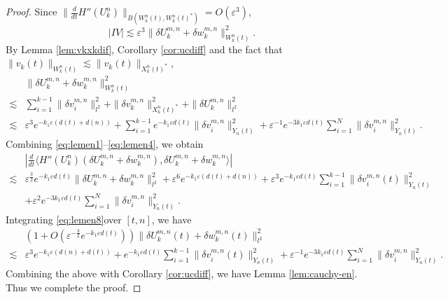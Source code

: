 \documentclass[11pt]{amsart}
\theoremstyle{remark}
\numberwithin{equation}{section}
\begin{document}
\begin{proof}
Since $\|\frac{d}{dt}H''(U_k^n)\|_{B(W_k^n(t),W_k^n(t)^*)}=O({\varepsilon}^3)$,
\begin{equation}
  \label{eq:lemen7}
  |IV|\lesssim  {\varepsilon}^3\|{\delta U}_k^{m,n}+{\delta w}^{m,n}_k\|_{W_k^n(t)}^2.
\end{equation}
By Lemma \ref{lem:vkxkdif}, Corollary \ref{cor:ucdiff}
and the fact that $\|v_k(t)\|_{W_k^n(t)}\lesssim \|v_k(t)\|_{X_k^n(t)^*}$,
\begin{equation}
  \label{eq:lemen4}
  \begin{split}
& \|{\delta U}_k^{m,n}+{\delta w}^{m,n}_k\|_{W_k^n(t)}^2 \\ \lesssim & \sum_{i=1}^{k-1}\|{\delta v}_i^{m,n}\|_{l^2}^2
+\|{\delta v}_k^{m,n}\|_{X_k^n(t)^*}^2 +\|{\delta U}_k^{m,n}\|_{l^2}^2
\\ \lesssim & {\varepsilon}^3e^{-k_1{\varepsilon}(d(t)+d(n))}
+\sum_{i=1}^{k-1}e^{-k_1{\varepsilon} d(t)}\|{\delta v}_i^{m,n}\|_{Y_n(t)}^2
+ {\varepsilon}^{-1}e^{-3k_1{\varepsilon} d(t)}\sum_{i=1}^N \|{\delta v}_i^{m,n}\|_{Y_n(t)}^2.
  \end{split}
\end{equation}
Combining \eqref{eq:lemen1}--\eqref{eq:lemen4}, we obtain
\begin{equation}
  \label{eq:lemen8}
  \begin{split}
    & \left|\frac{d}{dt}{\langle} H''(U_k^n)({\delta U}_k^{m,n}+{\delta w}^{m,n}_k), {\delta U}_k^{m,n}+{\delta w}^{m,n}_k{\rangle}\right|
\\ \lesssim & {\varepsilon}^{\frac32}e^{-k_1{\varepsilon} d(t)}\|{\delta U}_k^{m,n}+{\delta w}^{m,n}_k\|_{l^2}^2
+{\varepsilon}^6e^{-k_1{\varepsilon}(d(t)+d(n))}+{\varepsilon}^3e^{-k_1{\varepsilon} d(t)}\sum_{i=1}^{k-1}\|{\delta v}_i^{m,n}(t)\|_{Y_n(t)}^2
\\ & +{\varepsilon}^2e^{-3k_1{\varepsilon} d(t)}\sum_{i=1}^N\|{\delta v}_i^{m,n}\|_{Y_n(t)}^2.
  \end{split}
\end{equation}
Integrating \eqref{eq:lemen8}over $[t,n]$, we have
\begin{equation}
  \label{eq:dukwkl2}
  \begin{split}
& \left(1+O({\varepsilon}^{-\frac32}e^{-k_1{\varepsilon} d(t)})\right)
\|{\delta U}_k^{m,n}(t)+{\delta w}^{m,n}_k(t)\|_{l^2}^2
\\ \lesssim & {\varepsilon}^3e^{-k_1{\varepsilon}(d(n)+d(t))}
+e^{-k_1{\varepsilon} d(t)}\sum_{i=1}^{k-1}\|{\delta v}_i^{m,n}(t)\|_{Y_n(t)}^2
+{\varepsilon}^{-1}e^{-3k_1{\varepsilon} d(t)}\sum_{i=1}^N\|{\delta v}_i^{m,n}\|_{Y_n(t)}^2.
  \end{split}
\end{equation}
Combining the above with Corollary \ref{cor:ucdiff}, we have
Lemma \ref{lem:cauchy-en}. Thus we complete the proof.
\end{proof}
\end{document}
